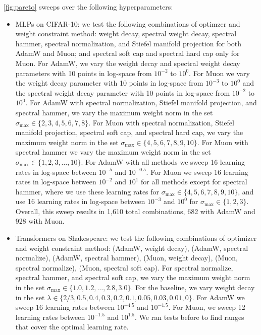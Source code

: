 \cref{fig:pareto} sweeps over the following hyperparameters:
\begin{itemize}
    \item MLPs on CIFAR-10: we test the following combinations of optimzer and weight constraint method: weight decay, spectral weight decay, spectral hammer, spectral normalization, and Stiefel manifold projection for both AdamW and Muon; and spectral soft cap and spectral hard cap only for Muon. For AdamW, we vary the weight decay and spectral weight decay parameters with 10 points in log-space from $10^{-2}$ to $10^{0}$. For Muon we vary the weight decay parameter with 10 points in log-space from $10^{-3}$ to $10^{0}$ and the spectral weight decay parameter with 10 points in log-space from $10^{-2}$ to $10^{0}$. For AdamW with spectral normalization, Stiefel manifold projection, and spectral hammer, we vary the maximum weight norm in the set $\sigma_\text{max} \in \{2, 3, 4, 5, 6, 7, 8\}$. For Muon with spectral normalization, Stiefel manifold projection, spectral soft cap, and spectral hard cap, we vary the maximum weight norm in the set $\sigma_\text{max} \in \{4, 5, 6, 7, 8, 9, 10\}$. For Muon with spectral hammer we vary the maximum weight norm in the set $\sigma_\text{max} \in \{1, 2, 3, \ldots , 10\}$. For AdamW with all methods we sweep 16 learning rates in log-space between $10^{-5}$ and $10^{-0.5}$. For Muon we sweep 16 learning rates in log-space between $10^{-2}$ and $10^{1}$ for all methods except for spectral hammer, where we use these learning rates for $\sigma_\text{max} \in \{4, 5, 6, 7, 8, 9, 10\}$, and use 16 learning rates in log-space between $10^{-3}$ and $10^{0}$ for  $\sigma_\text{max} \in \{1, 2, 3\}$. Overall, this sweep results in 1,610 total combinations, 682 with AdamW and 928 with Muon.
    \item Transformers on Shakespeare: we test the following combinations of optimizer and weight constraint method: (AdamW, weight decay), (AdamW, spectral normalize), (AdamW, spectral hammer), (Muon, weight decay), (Muon, spectral normalize), (Muon, spectral soft cap). For spectral normalize, spectral hammer, and spectral soft cap, we vary the maximum weight norm in the set $\sigma_\text{max} \in \{1.0, 1.2, \dots, 2.8, 3.0\}$. For the baseline, we vary weight decay in the set $\lambda \in \{2/3, 0.5, 0.4, 0.3, 0.2, 0.1, 0.05, 0.03, 0.01, 0\}$. For AdamW we sweep 16 learning rates between $10^{-4.5}$ and $10^{-1.5}$. For Muon, we sweep 12 learning rates between $10^{-1.5}$ and $10^{1.5}$. We ran tests before to find ranges that cover the optimal learning rate.
\end{itemize}

